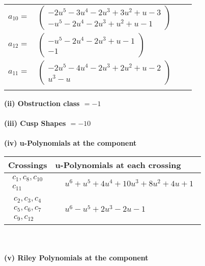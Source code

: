 \documentclass[1p]{elsarticle_modified}
\theoremstyle{definition}
\begin{document}
\begin{tabular}{m{7pt} m{180pt} m{7pt} m{180pt} }
\flushright $a_{10}=$&$\begin{pmatrix}-2 u^5-3 u^4-2 u^3+3 u^2+u-3\\- u^5-2 u^4-2 u^3+u^2+u-1\end{pmatrix}$ \\
\flushright $a_{12}=$&$\begin{pmatrix}- u^5-2 u^4-2 u^3+u-1\\-1\end{pmatrix}$ \\
\flushright $a_{11}=$&$\begin{pmatrix}-2 u^5-4 u^4-2 u^3+2 u^2+u-2\\u^3- u\end{pmatrix}$\\&\end{tabular}
\flushleft \textbf{(ii) Obstruction class $= -1$}\\~\\
\flushleft \textbf{(iii) Cusp Shapes $= -10$}\\~\\
\newpage\renewcommand{\arraystretch}{1}
\flushleft \textbf{(iv) u-Polynomials at the component}\newline \\
\begin{tabular}{m{50pt}|m{274pt}}
Crossings & \hspace{64pt}u-Polynomials at each crossing \\
\hline $$\begin{aligned}c_{1},c_{8},c_{10}\\c_{11}\end{aligned}$$&$\begin{aligned}
&u^6+u^5+4 u^4+10 u^3+8 u^2+4 u+1
\end{aligned}$\\
\hline $$\begin{aligned}c_{2},c_{3},c_{4}\\c_{5},c_{6},c_{7}\\c_{9},c_{12}\end{aligned}$$&$\begin{aligned}
&u^6- u^5+2 u^3-2 u-1
\end{aligned}$\\
\hline
\end{tabular}\\~\\
\newpage\renewcommand{\arraystretch}{1}
\flushleft \textbf{(v) Riley Polynomials at the component}\newline \\
\end{document}

